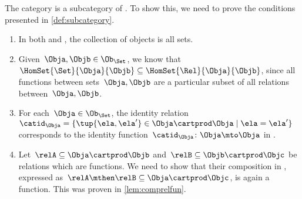 \begin{example}
    The category \Set is a subcategory of \Rel.
    To show this, we need to prove the conditions presented in \cref{def:subcategory}.
    \begin{enumerate}
        \item In both \Rel and \Set, the collection of objects is all sets.
        \item Given~$\Obja,\Objb\in \Ob_{\Set}$, we know that~$\HomSet{\Set}{\Obja}{\Objb}\subseteq \HomSet{\Rel}{\Obja}{\Objb}$, since all functions between sets~$\Obja,\Objb$ are a particular subset of all relations between~$\Obja,\Objb$.
        \item For each~$\Obja \in \Ob_{\Set}$, the identity relation~$\catid_\Obja=\{\tup{\ela,\ela'}\in \Obja\cartprod \Obja \mid \ela=\ela'\}$ corresponds to the identity function~$\catid_\Obja \colon \Obja \mto \Obja$ in \Set.
        \item Let~$\relA\subseteq \Obja\cartprod \Objb$ and~$\relB\subseteq \Objb \cartprod \Objc$ be relations which are functions.
              We need to show that their composition in \Rel, expressed as~$\relA\mthen \relB\subseteq \Obja\cartprod \Objc$, is again a function.
              This was proven in \cref{lem:comprelfun}.
    \end{enumerate}

\end{example}

